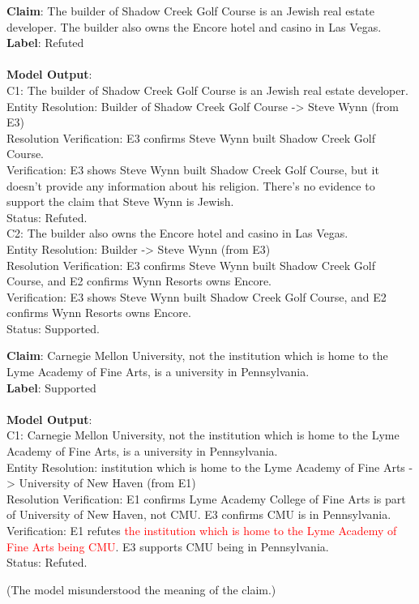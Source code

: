 \small{\begin{casebox}
\textbf{Claim}: The builder of Shadow Creek Golf Course is an Jewish real estate developer. The builder also owns the Encore hotel and casino in Las Vegas.\\
\textbf{Label}: Refuted\\\\
\textbf{Model Output}:\\
C1: The builder of Shadow Creek Golf Course is an Jewish real estate developer.\\Entity Resolution: Builder of Shadow Creek Golf Course -> Steve Wynn (from E3)\\Resolution Verification: E3 confirms Steve Wynn built Shadow Creek Golf Course.\\Verification: E3 shows Steve Wynn built Shadow Creek Golf Course, but it doesn't provide any information about his religion. There's no evidence to support the claim that Steve Wynn is Jewish.\\Status: Refuted.\vspace{1mm}\\C2: The builder also owns the Encore hotel and casino in Las Vegas.\\Entity Resolution: Builder -> Steve Wynn (from E3)\\Resolution Verification: E3 confirms Steve Wynn built Shadow Creek Golf Course, and E2 confirms Wynn Resorts owns Encore.\\Verification: E3 shows Steve Wynn built Shadow Creek Golf Course, and E2 confirms Wynn Resorts owns Encore.\\Status: Supported.
\end{casebox}}

\small{\begin{casebox}
\textbf{Claim}: Carnegie Mellon University, not the institution which is home to the Lyme Academy of Fine Arts, is a university in Pennsylvania.\\
\textbf{Label}: Supported\\\\
\textbf{Model Output}:\\
C1: Carnegie Mellon University, not the institution which is home to the Lyme Academy of Fine Arts, is a university in Pennsylvania.\\Entity Resolution: institution which is home to the Lyme Academy of Fine Arts -> University of New Haven (from E1)\\Resolution Verification: E1 confirms Lyme Academy College of Fine Arts is part of University of New Haven, not CMU. E3 confirms CMU is in Pennsylvania.\\Verification: E1 refutes \textcolor{red}{the institution which is home to the Lyme Academy of Fine Arts being CMU}. E3 supports CMU being in Pennsylvania.\\Status: Refuted.
\end{casebox}}
(The model misunderstood the meaning of the claim.)

